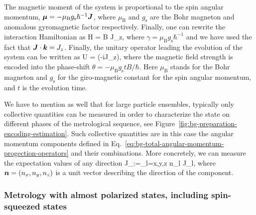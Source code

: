 The magnetic moment of the system is proportional to the spin angular momentum, $\boldsymbol{\mu}=-\mu_\text{B} g_{\text{s}}\hbar^{-1} \boldsymbol{J}$, where $\mu_{\text{B}}$ and $g_{\text{s}}$ are the Bohr magneton and anomalous gyromagnetic factor respectively.
Finally, one can rewrite the interaction Hamiltonian as
\be
  \label{eq:bg-hamiltonian-homogeneous-field}
  H = \gamma B J_z,
\ee
where $\gamma = \mu_\text{B} g_{\text{s}}\hbar^{-1}$ and we have used the fact that $\boldsymbol{J}\cdot\boldsymbol{k}=J_z$.
Finally, the unitary operator leading the evolution of the system can be written as
\be
  \label{eq:bg-unitary-homogeneous-field}
  U = \exp(-i\theta J_z),
\ee
where the magnetic field strength is encoded into the phase-shift $\theta=-\mu_\text{B} g_\text{s} t B/\hbar$.
Here $\mu_\text{B}$ stands for the Bohr magneton and $g_\text{s}$ for the giro-magnetic constant for the spin angular momentum, and $t$ is the evolution time.

We have to mention as well that for large particle ensembles, typically only collective quantities can be measured in order to characterize the state on different phases of the metrological sequence, see Figure~\ref{fig:bg-preparation-encoding-estimation}.
Such collective quantities are in this case the angular momentum components defined in Eq.~\eqref{eq:bg-total-angular-momentum-progection-operators} and their combinations.
More concretely, we can measure the expectation values of any direction
\be
  \label{eq:bg-total-angular-momentum-projector-arbitrary-direction}
  J_{}:=\sum_{l=x,y,z} n_l J_l,
\ee
where $\boldsymbol{n}=(n_x,n_y,n_z)$ is a unit vector describing the direction of the component.

\subsubsection[Metrology with almost polarized states]{Metrology with almost polarized states, including spin-squeezed states}

